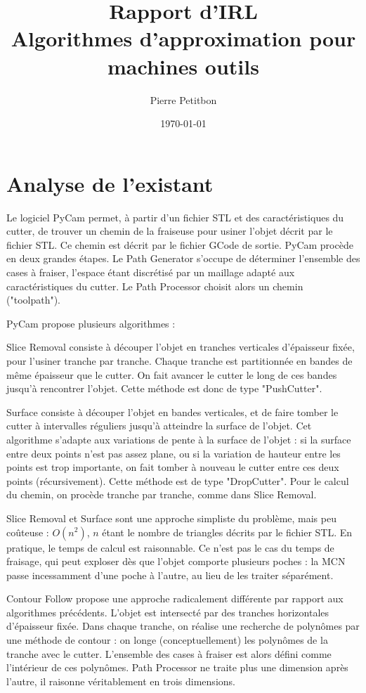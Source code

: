 \documentclass{article}
\title{Rapport d'IRL\\Algorithmes d'approximation pour machines outils}
\author{Pierre Petitbon}
\date{\today}
\begin{document}
\maketitle

\section{Analyse de l'existant}

Le logiciel PyCam permet, à partir d'un fichier STL et des caractéristiques du cutter, de trouver un chemin de la fraiseuse pour usiner l'objet décrit par le fichier STL. Ce chemin est décrit par le fichier GCode de sortie.
PyCam procède en deux grandes étapes.
Le Path Generator s'occupe de déterminer l'ensemble des cases à fraiser, l'espace étant discrétisé par un maillage adapté aux caractéristiques du cutter.
Le Path Processor choisit alors un chemin ("toolpath").

PyCam propose plusieurs algorithmes :

Slice Removal consiste à découper l'objet en tranches verticales d'épaisseur fixée, pour l'usiner tranche par tranche. Chaque tranche est partitionnée en bandes de même épaisseur que le cutter. On fait avancer le cutter le long de ces bandes jusqu'à rencontrer l'objet. Cette méthode est donc de type "PushCutter".

Surface consiste à découper l'objet en bandes verticales, et de faire tomber le cutter à intervalles réguliers jusqu'à atteindre la surface de l'objet. Cet algorithme s'adapte aux variations de pente à la surface de l'objet : si la surface entre deux points n'est pas assez plane, ou si la variation de hauteur entre les points est trop importante, on fait tomber à nouveau le cutter entre ces deux points (récursivement). Cette méthode est de type "DropCutter". Pour le calcul du chemin, on procède tranche par tranche, comme dans Slice Removal.

Slice Removal et Surface sont une approche simpliste du problème, mais peu coûteuse : $O(n^{2})$, $n$ étant le nombre de triangles décrits par le fichier STL. En pratique, le temps de calcul est raisonnable. Ce n'est pas le cas du temps de fraisage, qui peut exploser dès que l'objet comporte plusieurs poches : la MCN passe incessamment d'une poche à l'autre, au lieu de les traiter séparément.

Contour Follow propose une approche radicalement différente par rapport aux algorithmes précédents. L'objet est intersecté par des tranches horizontales d'épaisseur fixée. Dans chaque tranche, on réalise une recherche de polynômes par une méthode de contour : on longe (conceptuellement) les polynômes de la tranche avec le cutter. L'ensemble des cases à fraiser est alors défini comme l'intérieur de ces polynômes. Path Processor ne traite plus une dimension après l'autre, il raisonne véritablement en trois dimensions.
\end{document}
